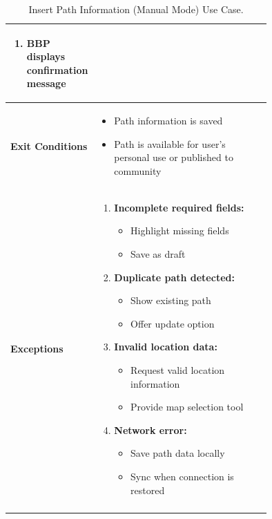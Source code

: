 \begin{center}
\begin{longtable}{|l|p{0.75\linewidth}|}
\begin{enumerate}
            \item BBP displays confirmation message
        \end{enumerate} \\
        \hline
        \textbf{Exit Conditions}   & 
        \begin{itemize}
            \item Path information is saved
            \item Path is available for user's personal use or published to community
        \end{itemize} \\
        \hline
        \textbf{Exceptions}       & 
        \begin{enumerate}
            \item \textbf{Incomplete required fields:}
            \begin{itemize}
                \item Highlight missing fields
                \item Save as draft
            \end{itemize}
            \item \textbf{Duplicate path detected:}
            \begin{itemize}
                \item Show existing path
                \item Offer update option
            \end{itemize}
            \item \textbf{Invalid location data:}
            \begin{itemize}
                \item Request valid location information
                \item Provide map selection tool
            \end{itemize}
            \item \textbf{Network error:}
            \begin{itemize}
                \item Save path data locally
                \item Sync when connection is restored
            \end{itemize}
        \end{enumerate} \\
        \hline
        \caption{Insert Path Information (Manual Mode) Use Case.}
        \label{tab:insert_path_manual_use_case}
    \end{longtable}
\end{center}


